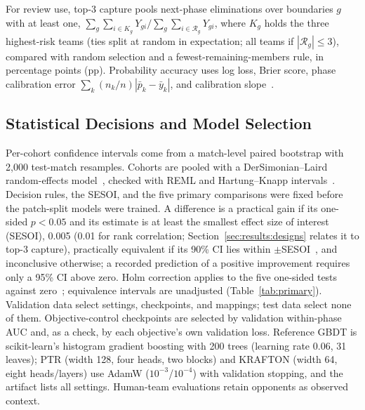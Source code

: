 \documentclass[sigconf,anonymous,nonacm]{acmart}
\begin{document}
For review use, top-3 capture pools next-phase eliminations over boundaries $g$ with at least one, $\sum_g\sum_{i\in K_g}Y_{gi}/\sum_g\sum_{i\in\mathcal{R}_g}Y_{gi}$, where $K_g$ holds the three highest-risk teams (ties split at random in expectation; all teams if $|\mathcal{R}_g|\le3$), compared with random selection and a fewest-remaining-members rule, in percentage points (pp). Probability accuracy uses log loss, Brier score, phase calibration error $\sum_k(n_k/n)|\bar p_k-\bar y_k|$, and calibration slope~\cite{VanCalster16}.

\subsection{Statistical Decisions and Model Selection}
Per-cohort confidence intervals come from a match-level paired bootstrap with 2,000 test-match resamples.
Cohorts are pooled with a DerSimonian--Laird random-effects model~\cite{DerSimonian86}, checked with REML and Hartung--Knapp intervals~\cite{HartungKnapp01}.
Decision rules, the SESOI, and the five primary comparisons were fixed before the patch-split models were trained. A difference is a practical gain if its one-sided $p<0.05$ and its estimate is at least the smallest effect size of interest (SESOI), 0.005 (0.01 for rank correlation; Section~\ref{sec:results:designs} relates it to top-3 capture), practically equivalent if its 90\% CI lies within $\pm$SESOI~\cite{Schuirmann87}, and inconclusive otherwise; a recorded prediction of a positive improvement requires only a 95\% CI above zero.
Holm correction applies to the five one-sided tests against zero~\cite{Holm79}; equivalence intervals are unadjusted (Table~\ref{tab:primary}).
Validation data select settings, checkpoints, and mappings; test data select none of them. Objective-control checkpoints are selected by validation within-phase AUC and, as a check, by each objective's own validation loss. Reference GBDT is scikit-learn's histogram gradient boosting with 200 trees (learning rate 0.06, 31 leaves); PTR (width 128, four heads, two blocks) and KRAFTON (width 64, eight heads/layers) use AdamW ($10^{-3}$/$10^{-4}$) with validation stopping, and the artifact lists all settings. Human-team evaluations retain opponents as observed context.


\end{document}

